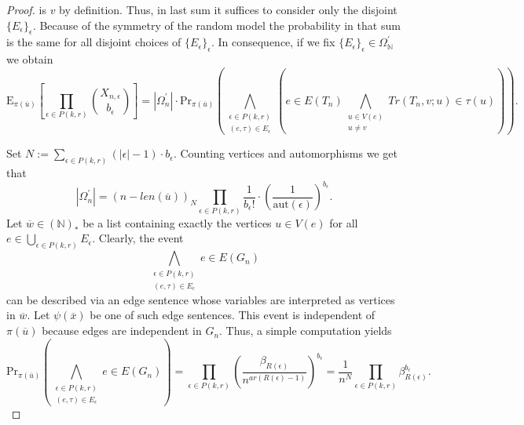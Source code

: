 \documentclass[12pt,notitlepage,a4paper]{article}
\theoremstyle{definition}
\newcommand{\N}{\mathbb{N}}
\newcommand{\aut}{\mathrm{aut}}
\begin{document}
\begin{proof}
	is $v$ by definition.  
	Thus, in last sum it suffices to consider only 
	the disjoint $\{E_\epsilon\}_\epsilon$.
	Because of the symmetry of the random model the probability
	in that sum is the same for all disjoint choices of
	$\{E_\epsilon\}_\epsilon$.
	In consequence, if we fix
	$\{E_\epsilon\}_{\epsilon}\in \Omega^\prime_\N$
	we obtain
	\begin{equation} \label{eqn:aux2}
	\mathrm{E}_{\pi(\overline{u})}
	\left[
	\prod_{\epsilon\in P(k,r)} \binom{X_{n,\epsilon}}{b_\epsilon}	
	\right]
	= 
	|\Omega_n^\prime|\cdot
	\mathrm{Pr}_{\pi(\overline{u})}\left(
	\bigwedge_{\substack{
			\epsilon\in P(k,r)\\
			(e, \tau)\in E_{\epsilon}
	}} \left(
	e\in E(T_n) \bigwedge_{\substack{
			u\in V(e)\\
			u\neq v}} Tr(T_n,v;u)\in \tau(u)		
	\right)
	\right). 		
	\end{equation}
	
	Set $N:=\sum_{\epsilon\in P(k,r)} 
	(|\epsilon|-1)\cdot b_\epsilon$.
	Counting vertices and automorphisms we get that
	\begin{equation} \label{eqn:aux3}
	|\Omega_n^\prime|= (n-len(\overline{u}))_{N}
	\prod_{\epsilon\in P(k,r)}
	\frac{1}{b_\epsilon!} \cdot
	\left( \frac{1}{\aut(\epsilon)} \right)^
	{b_\epsilon} .
	\end{equation}
	Let $\overline{w}\in (\N)_*$ be a list containing exactly
	the vertices $u\in V(e)$ for all $e\in 
	\bigcup_{\epsilon\in P(k,r)} E_\epsilon$. 
	Clearly, the event 
	\[ \bigwedge_{\substack{
			\epsilon\in P(k,r)\\
			(e, \tau)\in E_{\epsilon}
	}} e\in E(G_n)
	\]  can be described via an edge sentence
	whose variables are interpreted as vertices in $\overline{w}$.
	Let $\psi(\overline{x})$ be one of such edge sentences.
	This event is independent of $\pi(\overline{u})$ because edges are
	independent in $G_n$. Thus, a simple computation yields
	\[ 
	\mathrm{Pr}_{\pi(\overline{u})}
	\left(\bigwedge_{\substack{
			\epsilon\in P(k,r)\\
			(e, \tau)\in E_{\epsilon}
	}} e\in E(G_n)\right) = \prod_{\epsilon\in
	P(k,r)} \left(
	\frac{\beta_{R(\epsilon)}}{n^{ar(R(\epsilon)-1)}}
	\right)^{b_\epsilon}=
	\frac{1}{n^N}
	\prod_{\epsilon\in
	P(k,r)} \beta_{R(\epsilon)}^{b_\epsilon}.
	\]
	

\end{proof}
\end{document}
